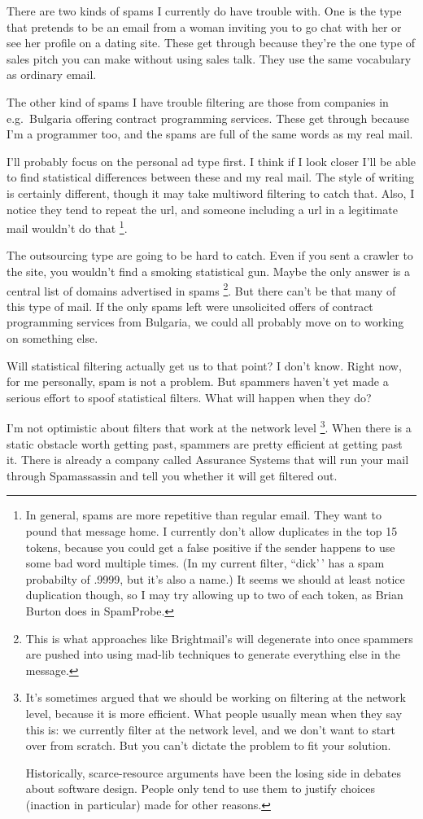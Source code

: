 \documentclass[12pt]{book}
\begin{document}
There are two kinds of spams I currently do have trouble with. One is
the type that pretends to be an email from a woman inviting you to go
chat with her or see her profile on a dating site. These get through
because they're the one type of sales pitch you can make without using
sales talk. They use the same vocabulary as ordinary email.

The other kind of spams I have trouble filtering are those from
companies in e.g.~Bulgaria offering contract programming services. These
get through because I'm a programmer too, and the spams are full of the
same words as my real mail.

I'll probably focus on the personal ad type first. I think if I look
closer I'll be able to find statistical differences between these and my
real mail. The style of writing is certainly different, though it may
take multiword filtering to catch that. Also, I notice they tend to
repeat the url, and someone including a url in a legitimate mail
wouldn't do that \footnote{In general, spams are more repetitive than regular email. They
want to pound that message home. I currently don't allow duplicates in
the top 15 tokens, because you could get a false positive if the sender
happens to use some bad word multiple times. (In my current filter,
``dick'\,' has a spam probabilty of .9999, but it's also a name.) It
seems we should at least notice duplication though, so I may try
allowing up to two of each token, as Brian Burton does in SpamProbe.}.

The outsourcing type are going to be hard to catch. Even if you sent a
crawler to the site, you wouldn't find a smoking statistical gun. Maybe
the only answer is a central list of domains advertised in spams
\footnote{This is what approaches like Brightmail's will degenerate into
once spammers are pushed into using mad-lib techniques to generate
everything else in the message.}. But there can't be that many of this type of mail. If the only
spams left were unsolicited offers of contract programming services from
Bulgaria, we could all probably move on to working on something else.

Will statistical filtering actually get us to that point? I don't know.
Right now, for me personally, spam is not a problem. But spammers
haven't yet made a serious effort to spoof statistical filters. What
will happen when they do?

I'm not optimistic about filters that work at the network level
\footnote{It's sometimes argued that we should be working on filtering at
the network level, because it is more efficient. What people usually
mean when they say this is: we currently filter at the network level,
and we don't want to start over from scratch. But you can't dictate the
problem to fit your solution.

Historically, scarce-resource arguments have been the losing side in
debates about software design. People only tend to use them to justify
choices (inaction in particular) made for other reasons.}. When there is a static obstacle worth getting past, spammers
are pretty efficient at getting past it. There is already a company
called Assurance Systems that will run your mail through Spamassassin
and tell you whether it will get filtered out.
\end{document}
